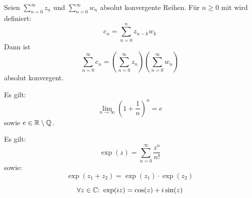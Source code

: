 \begin{framedthm}
	Seien $\sum_{n=0}^{\infty} z_n$ und $\sum_{n=0}^{\infty} w_n$ absolut konvergente Reihen. Für $n\geq 0$ mit wird definiert: \[c_n = \sum_{n=0}^{n} z_{n-k} w_k\]
	Dann ist \[\sum_{n=0}^{\infty} c_n = (\sum_{n=0}^{\infty} z_n)(\sum_{n=0}^{\infty} w_n)\] absolut konvergent.
\end{framedthm}

\begin{framedthm}
	Es gilt:
	\[\lim_{n \to \infty} \left(1+ \frac{1}{n}\right)^n = e\]
	sowie $e \in \mathbb{R} \setminus \mathbb{Q}$.
\end{framedthm}

\begin{framedthm}
	Es gilt:
	\[\exp(z) = \sum_{n=0}^{\infty} \frac{z^n}{n!}\]
	sowie:
	\[\exp(z_1+z_2) = \exp(z_1)\cdot\exp(z_2)\]
\end{framedthm}

\begin{framedthm}
	\[\forall z \in \mathbb{C}{:}\  \exp(iz) = \cos(z) + i \sin(z)\]
\end{framedthm}
